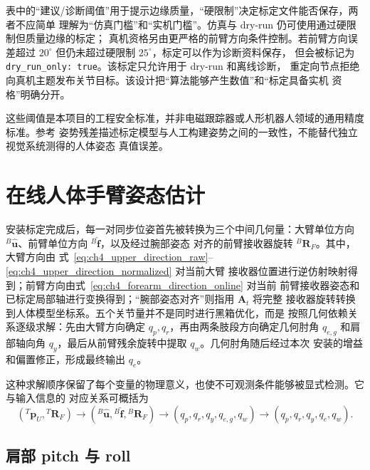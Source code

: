 表中的“建议/诊断阈值”用于提示边缘质量，“硬限制”决定标定文件能否保存，两者不应简单
理解为“仿真门槛”和“实机门槛”。仿真与 dry-run 仍可使用通过硬限制但质量边缘的标定；
真机资格另由更严格的前臂方向条件控制。若前臂方向误差超过 $20^\circ$ 但仍未超过硬限制
$25^\circ$，标定可以作为诊断资料保存，
但会被标记为 \texttt{dry\_run\_only: true}。该标定只允许用于 dry-run 和离线诊断，
重定向节点拒绝向真机主题发布关节目标。该设计把“算法能够产生数值”和“标定具备实机
资格”明确分开。

这些阈值是本项目的工程安全标准，并非电磁跟踪器或人形机器人领域的通用精度标准。参考
姿势残差描述标定模型与人工构建姿势之间的一致性，不能替代独立视觉系统测得的人体姿态
真值误差。

\section{在线人体手臂姿态估计}
\label{sec:ch4_online_arm_estimation}

安装标定完成后，每一对同步位姿首先被转换为三个中间几何量：大臂单位方向
${}^{B}\hat{\boldsymbol u}$、前臂单位方向 ${}^{B}\hat{\boldsymbol f}$，以及经过腕部姿态
对齐的前臂接收器旋转 ${}^{B}\boldsymbol R_F$。其中，大臂方向由
式~\eqref{eq:ch4_upper_direction_raw}--\eqref{eq:ch4_upper_direction_normalized} 对当前大臂
接收器位置进行逆仿射映射得到；前臂方向由式~\eqref{eq:ch4_forearm_direction_online} 对当前
前臂接收器姿态和已标定局部轴进行变换得到；“腕部姿态对齐”则指用 $\boldsymbol A_t$ 将完整
接收器旋转转换到人体模型坐标系。五个关节量并不是同时进行黑箱优化，而是
按照几何依赖关系逐级求解：先由大臂方向确定 $q_p,q_r$，再由两条肢段方向确定几何肘角
$q_{e,g}$ 和肩部轴向角 $q_y$，最后从前臂残余旋转中提取 $q_w$。几何肘角随后经过本次
安装的增益和偏置修正，形成最终输出 $q_e$。

这种求解顺序保留了每个变量的物理意义，也使不可观测条件能够被显式检测。它与输入信息的
对应关系可概括为
\begin{equation}
  ({}^{T}\boldsymbol p_U,{}^{T}\boldsymbol R_F)
  \longrightarrow
  ({}^{B}\hat{\boldsymbol u},{}^{B}\hat{\boldsymbol f},
   {}^{B}\boldsymbol R_F)
  \longrightarrow
  (q_p,q_r,q_y,q_{e,g},q_w)
  \longrightarrow
  (q_p,q_r,q_y,q_e,q_w).
  \label{eq:ch4_online_estimation_chain}
\end{equation}

\subsection{肩部 pitch 与 roll}
\label{subsec:ch4_shoulder_pitch_roll}

